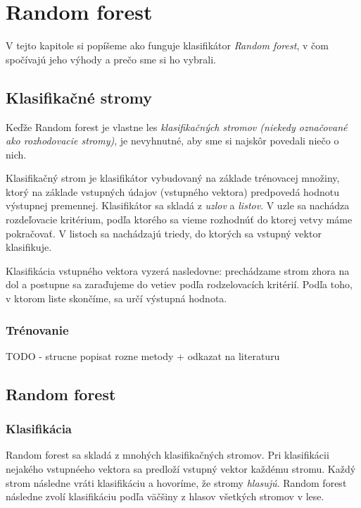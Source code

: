 \chapter{Random forest}

V tejto kapitole si popíšeme ako funguje klasifikátor \textit{Random forest}, v čom spočívajú jeho výhody a prečo sme si ho vybrali.

\section{Klasifikačné stromy}
Keďže Random forest je vlastne les \textit{klasifikačných stromov (niekedy označované ako rozhodovacie stromy)}, je nevyhnutné, aby sme si najskôr povedali niečo o nich.

Klasifikačný strom je klasifikátor vybudovaný na základe trénovacej množiny, ktorý na základe vstupných údajov (vstupného vektora) predpovedá hodnotu výstupnej premennej. Klasifikátor sa skladá z \textit{uzlov} a \textit{listov}. V uzle sa nachádza rozdeľovacie kritérium, podľa ktorého sa vieme rozhodnúť do ktorej vetvy máme pokračovať. V listoch sa nachádzajú triedy, do ktorých sa vstupný vektor klasifikuje.

Klasifikácia vstupného vektora vyzerá nasledovne: prechádzame strom zhora na dol a postupne sa zaraďujeme do vetiev podľa rodzelovacích kritérií. Podľa toho, v ktorom liste skončíme, sa určí výstupná hodnota.

\subsection{Trénovanie}
TODO - strucne popisat rozne metody + odkazat na literaturu

\section{Random forest}

\subsection{Klasifikácia}
Random forest sa skladá z mnohých klasifikačných stromov. Pri klasifikácii nejakého vstupnéeho vektora sa predloží vstupný vektor každému stromu. Každý strom následne vráti klasifikáciu a hovoríme, že stromy \textit{hlasujú}. Random forest následne zvolí klasifikáciu podľa väčšiny z hlasov všetkých stromov v lese.

